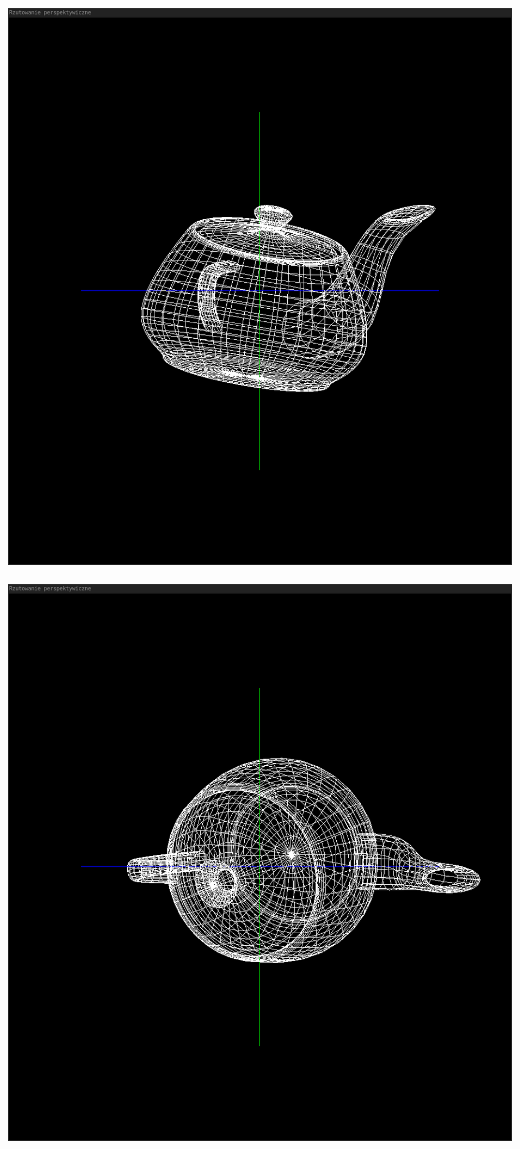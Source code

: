 \documentclass[polish,polish,a4paper]{report}
\begin{document}
\begin{center}
\includegraphics[width=\textwidth=2]{imbryk2}
\end{center}

\begin{center}
\includegraphics[width=\textwidth=2]{imbryk3}
\end{center}
\end{document}
